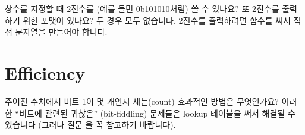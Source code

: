 \begin{faq}
	상수를 지정할 때 2진수를 (예를 들면 0b101010처럼) 쓸 수 있나요?
	또 2진수를 출력하기 위한  포맷이 있나요?
\A
	두 경우 모두 없습니다.  2진수를 출력하려면  함수를
	써서 직접 문자열을 만들어야 합니다.  
\end{faq}

\section{Efficiency}	\label{sec:efficiency}

\begin{faq}
	주어진 수치에서 비트 1이 몇 개인지 세는(count) 효과적인
	방법은 무엇인가요?
\A
	이러한 ``비트에 관련된 귀찮은'' (bit-fiddling) 문제들은
	lookup 테이블을 써서 해결될 수 있습니다 (그러나 질문 을
	꼭 참고하기 바랍니다).
\end{faq}

